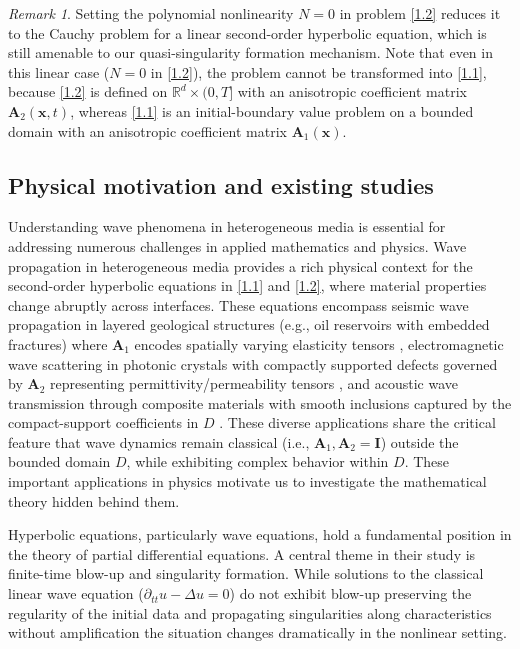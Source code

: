 \documentclass[11pt,reqno,oneside]{amsart}
\numberwithin{equation}{section}
\theoremstyle{definition}
\theoremstyle{remark}
\newtheorem{remark}[theorem]{Remark}
\numberwithin{equation}{section}
\begin{document}
	
	\begin{remark}
		Setting the polynomial nonlinearity $ N = 0 $ in problem \eqref{1.2} reduces it to the Cauchy problem for a linear second-order hyperbolic equation, which is still amenable to our quasi-singularity formation mechanism. Note that even in this linear case ($ N = 0 $ in \eqref{1.2}), the problem cannot be transformed into \eqref{1.1}, because \eqref{1.2} is defined on $ \mathbb{R}^d \times (0,T] $ with an anisotropic coefficient matrix $ \mathbf{A}_2(\mathbf{x}, t) $, whereas \eqref{1.1} is an initial-boundary value problem on a bounded domain with an anisotropic coefficient matrix $ \mathbf{A}_1(\mathbf{x}) $.
		
		
	\end{remark}
	
	
	
	\subsection{Physical motivation and existing studies}
	Understanding wave phenomena in heterogeneous media is essential for addressing numerous challenges in applied mathematics and physics. Wave propagation in heterogeneous media provides a rich physical context for the second-order hyperbolic equations in \eqref{1.1} and \eqref{1.2}, where material properties change abruptly across interfaces. These equations encompass seismic wave propagation in layered geological structures (e.g., oil reservoirs with embedded fractures) where $\mathbf{A}_1$ encodes spatially varying elasticity tensors \cite{fichtner2011full}, electromagnetic wave scattering in photonic crystals with compactly supported defects governed by $\mathbf{A}_2$ representing permittivity/permeability tensors \cite{joannopoulos2008photonic}, and acoustic wave transmission through composite materials with smooth inclusions captured by the compact-support coefficients in $D$ \cite{craster2012acoustic}. These diverse applications share the critical feature that wave dynamics remain classical (i.e., $\mathbf{A}_1,\mathbf{A}_2 = \mathbf{I}$) outside the bounded domain $D$, while exhibiting complex behavior within $D$. These important applications in physics motivate us to investigate the mathematical theory hidden behind them.
	
	Hyperbolic equations, particularly wave equations, hold a fundamental position in the theory of partial differential equations. A central theme in their study is finite-time blow-up and singularity formation. While solutions to the classical linear wave equation ($\partial_{tt}u - \Delta u = 0$) do not exhibit blow-up preserving the regularity of the initial data \cite{Evans} and propagating singularities along characteristics without amplification \cite{Hormander} the situation changes dramatically in the nonlinear setting.
	
\end{document}
